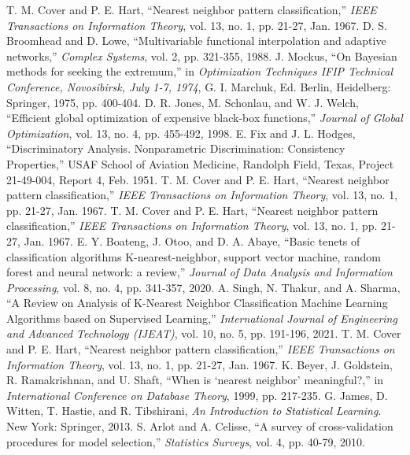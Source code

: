 \documentclass[conference]{IEEEtran}
\begin{document}
\begin{thebibliography}{99}
 T. M. Cover and P. E. Hart, “Nearest neighbor pattern classification,” \textit{IEEE Transactions on Information Theory}, vol. 13, no. 1, pp. 21-27, Jan. 1967.
 D. S. Broomhead and D. Lowe, “Multivariable functional interpolation and adaptive networks,” \textit{Complex Systems}, vol. 2, pp. 321-355, 1988.
 J. Mockus, “On Bayesian methods for seeking the extremum,” in \textit{Optimization Techniques IFIP Technical Conference, Novosibirsk, July 1-7, 1974}, G. I. Marchuk, Ed. Berlin, Heidelberg: Springer, 1975, pp. 400-404.
 D. R. Jones, M. Schonlau, and W. J. Welch, “Efficient global optimization of expensive black-box functions,” \textit{Journal of Global Optimization}, vol. 13, no. 4, pp. 455-492, 1998.
 E. Fix and J. L. Hodges, “Discriminatory Analysis. Nonparametric Discrimination: Consistency Properties,” USAF School of Aviation Medicine, Randolph Field, Texas, Project 21-49-004, Report 4, Feb. 1951.
 T. M. Cover and P. E. Hart, “Nearest neighbor pattern classification,” \textit{IEEE Transactions on Information Theory}, vol. 13, no. 1, pp. 21-27, Jan. 1967.
 T. M. Cover and P. E. Hart, “Nearest neighbor pattern classification,” \textit{IEEE Transactions on Information Theory}, vol. 13, no. 1, pp. 21-27, Jan. 1967.
 E. Y. Boateng, J. Otoo, and D. A. Abaye, “Basic tenets of classification algorithms K-nearest-neighbor, support vector machine, random forest and neural network: a review,” \textit{Journal of Data Analysis and Information Processing}, vol. 8, no. 4, pp. 341-357, 2020.
 A. Singh, N. Thakur, and A. Sharma, “A Review on Analysis of K-Nearest Neighbor Classification Machine Learning Algorithms based on Supervised Learning,” \textit{International Journal of Engineering and Advanced Technology (IJEAT)}, vol. 10, no. 5, pp. 191-196, 2021.
 T. M. Cover and P. E. Hart, “Nearest neighbor pattern classification,” \textit{IEEE Transactions on Information Theory}, vol. 13, no. 1, pp. 21-27, Jan. 1967.
 K. Beyer, J. Goldstein, R. Ramakrishnan, and U. Shaft, “When is ‘nearest neighbor’ meaningful?,” in \textit{International Conference on Database Theory}, 1999, pp. 217-235.
 G. James, D. Witten, T. Hastie, and R. Tibshirani, \textit{An Introduction to Statistical Learning}. New York: Springer, 2013.
 S. Arlot and A. Celisse, “A survey of cross-validation procedures for model selection,” \textit{Statistics Surveys}, vol. 4, pp. 40-79, 2010.

\end{thebibliography}
\end{document}
